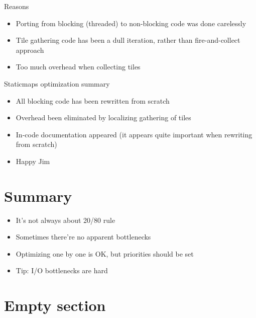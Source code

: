 \documentclass[16pt]{beamer}
\begin{document}
\begin{frame}{Reasons}
  \begin{itemize}
  \item Porting from blocking (threaded) to non-blocking code was done carelessly
  \item Tile gathering code has been a dull iteration, rather than fire-and-collect approach
  \item Too much overhead when collecting tiles
  \end{itemize}
\end{frame}

\begin{frame}{Staticmaps optimization summary}
  \begin{itemize}
  \item All blocking code has been rewritten from scratch
  \item Overhead been eliminated by localizing gathering of tiles
  \item In-code documentation appeared (it appears quite important when rewriting from scratch)
  \item Happy Jim
  \end{itemize}
\end{frame}

\section*{Summary}

\begin{frame}{}
  \begin{itemize}
  \item It's not always about 20/80 rule
  \item Sometimes there're no apparent bottlenecks
  \item Optimizing one by one is OK, but priorities should be set
  \item Tip: I/O bottlenecks are hard
  \end{itemize}
\end{frame}

\section{Empty section}
\end{document}
